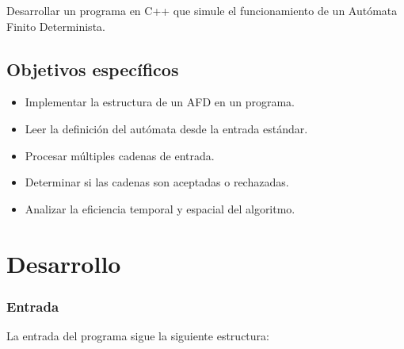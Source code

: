 \documentclass[12pt]{article}
\begin{document}
Desarrollar un programa en C++ que simule el funcionamiento de un Autómata Finito Determinista.

\subsection{Objetivos específicos}

\begin{itemize}

\item Implementar la estructura de un AFD en un programa.
\item Leer la definición del autómata desde la entrada estándar.
\item Procesar múltiples cadenas de entrada.
\item Determinar si las cadenas son aceptadas o rechazadas.
\item Analizar la eficiencia temporal y espacial del algoritmo.

\end{itemize}

\newpage


\section{Desarrollo}

\subsubsection{Entrada}

La entrada del programa sigue la siguiente estructura:
\end{document}
